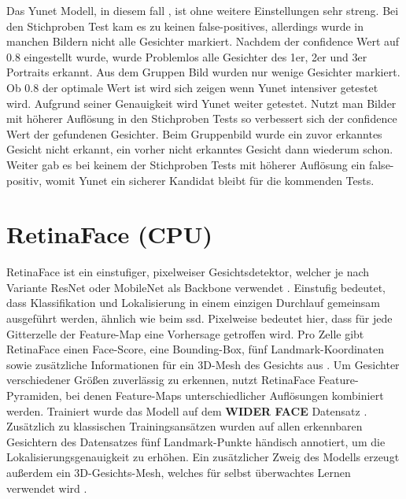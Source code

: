 Das Yunet Modell, in diesem fall , ist ohne weitere Einstellungen sehr streng. Bei den Stichproben Test kam es zu keinen false-positives, allerdings wurde in manchen Bildern nicht alle Gesichter markiert. Nachdem der confidence Wert auf 0.8 eingestellt wurde, wurde Problemlos alle Gesichter des 1er, 2er und 3er Portraits erkannt. Aus dem Gruppen Bild wurden nur wenige Gesichter markiert. Ob 0.8 der optimale Wert ist wird sich zeigen wenn Yunet intensiver getestet wird. Aufgrund seiner Genauigkeit wird Yunet weiter getestet. Nutzt man Bilder mit höherer Auflösung in den Stichproben Tests so verbessert sich der confidence Wert der gefundenen Gesichter. Beim Gruppenbild wurde ein zuvor erkanntes Gesicht nicht erkannt, ein vorher nicht erkanntes Gesicht dann wiederum schon. Weiter gab es bei keinem der Stichproben Tests mit höherer Auflösung ein false-positiv, womit Yunet ein sicherer Kandidat bleibt für die kommenden Tests.

\section{RetinaFace (CPU)}
RetinaFace ist ein einstufiger, pixelweiser Gesichtsdetektor, welcher je nach Variante ResNet oder MobileNet als Backbone verwendet \parencite{abs-1905-00641}. Einstufig bedeutet, dass Klassifikation und Lokalisierung in einem einzigen Durchlauf gemeinsam ausgeführt werden, ähnlich wie beim \gls{ssd}. Pixelweise bedeutet hier, dass für jede Gitterzelle der Feature-Map eine Vorhersage getroffen wird.
Pro Zelle gibt RetinaFace einen Face-Score, eine Bounding-Box, fünf Landmark-Koordinaten sowie zusätzliche Informationen für ein 3D-Mesh des Gesichts aus \parencite{abs-1905-00641}. Um Gesichter verschiedener Größen zuverlässig zu erkennen, nutzt RetinaFace Feature-Pyramiden, bei denen Feature-Maps unterschiedlicher Auflösungen kombiniert werden.
Trainiert wurde das Modell auf dem \textbf{WIDER FACE} Datensatz \parencite{abs-1905-00641}. Zusätzlich zu klassischen Trainingsansätzen wurden auf allen erkennbaren Gesichtern des Datensatzes fünf Landmark-Punkte händisch annotiert, um die Lokalisierungsgenauigkeit zu erhöhen. Ein zusätzlicher Zweig des Modells erzeugt außerdem ein 3D-Gesichts-Mesh, welches für selbst überwachtes Lernen verwendet wird \parencite{abs-1905-00641}.

